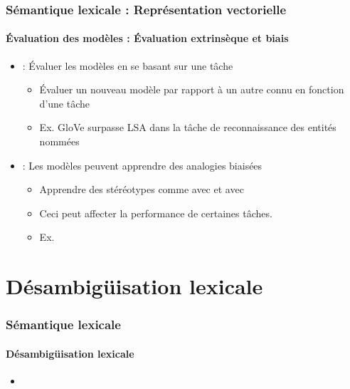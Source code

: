 \documentclass[xcolor=table]{beamer}
\begin{document}
\begin{frame}
\frametitle{Sémantique lexicale : Représentation vectorielle}
\framesubtitle{Évaluation des modèles : Évaluation extrinsèque et biais}
	
\begin{itemize}
	\item  {} : Évaluer les modèles en se basant sur une tâche 
	\begin{itemize}
		\item Évaluer un nouveau modèle par rapport à un autre connu en fonction d'une tâche
		\item Ex. GloVe surpasse LSA dans la tâche de reconnaissance des entités nommées \cite{2014-pennington-al}
	\end{itemize}
	\item {} : Les modèles peuvent apprendre des analogies biaisées
	\begin{itemize}
		\item Apprendre des stéréotypes comme  avec  et  avec  \cite{2017-caliskan-al}
		\item Ceci peut affecter la performance de certaines tâches. 
		\item Ex. 
	\end{itemize}
\end{itemize}
	
\end{frame}


\section{Désambigüisation lexicale}

\begin{frame}
\frametitle{Sémantique lexicale}
\framesubtitle{Désambigüisation lexicale}

\begin{itemize}
	\item 	
\end{itemize}

\end{frame}
\end{document}
